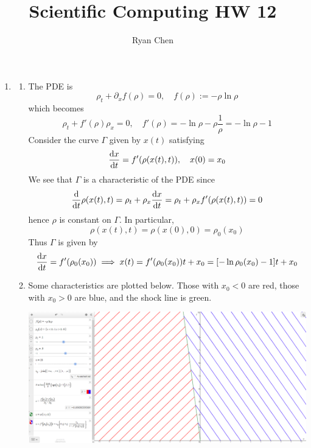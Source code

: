 \documentclass{article}
\title{Scientific Computing HW 12}
\author{Ryan Chen}
\newcommand{\imp}{\implies}
\newcommand{\ptl}{\partial}
\begin{document}
	
	
	
\maketitle



\begin{enumerate}



\item



\begin{enumerate}


	\item The PDE is
	$$\rho_t + \ptl_x f(\rho) = 0,
	\quad f(\rho) := -\rho\ln\rho$$
	which becomes
	$$\rho_t + f'(\rho)\rho_x = 0,
	\quad f'(\rho) = -\ln\rho - \rho\frac1\rho = -\ln\rho - 1$$
	Consider the curve $\Gamma$ given by $x(t)$ satisfying
	$$\dv{x}{t} = f'(\rho(x(t),t)),
	\quad x(0) = x_0$$
	We see that $\Gamma$ is a characteristic of the PDE since
	$$\dv{t}\rho(x(t),t) = \rho_t + \rho_x\dv{x}{t}
	= \rho_t + \rho_xf'(\rho(x(t),t))
	= 0$$
	hence $\rho$ is constant on $\Gamma$. In particular,
	$$\rho(x(t),t) = \rho(x(0),0) = \rho_0(x_0)$$
	Thus $\Gamma$ is given by
	$$\dv{x}{t} = f'(\rho_0(x_0))
	\imp x(t) = f'(\rho_0(x_0))t + x_0
	= [-\ln\rho_0(x_0)-1]t + x_0$$
	
	
	\item Some characteristics are plotted below. Those with $x_0<0$ are red, those with $x_0>0$ are blue, and the shock line is green.
	
	\begin{center}
		\includegraphics[scale=.3]{hw12 plot}
	\end{center}
	

\end{enumerate}
\end{enumerate}
\end{document}
